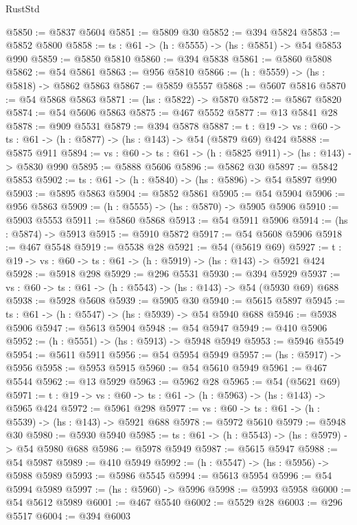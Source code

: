 \begin{lexlean}{RustStd}
\begin{coremodule}
@5850 := @5837 @5604
@5851 := @5809 @30
@5852 := @394 @5824
@5853 := @5852 @5800
@5858 := {ts : @61} -> (h : @5555) -> (hs : @5851) -> @54 @5853 @990
@5859 := @5850 @5810
@5860 := @394 @5838
@5861 := @5860 @5808
@5862 := @54 @5861
@5863 := @956 @5810
@5866 := (h : @5559) -> (hs : @5818) -> @5862 @5863
@5867 := @5859 @5557
@5868 := @5607 @5816
@5870 := @54 @5868 @5863
@5871 := (hs : @5822) -> @5870
@5872 := @5867 @5820
@5874 := @54 @5606 @5863
@5875 := @467 @5552
@5877 := @13 @5841 @28
@5878 := @909 @5531
@5879 := @394 @5878
@5887 := {t : @19} -> {vs : @60} -> {ts : @61} -> (h : @5877) -> (hs : @143) -> @54 (@5879 @69) @424
@5888 := @5875 @911
@5894 := {vs : @60} -> {ts : @61} -> (h : @5825 @911) -> (hs : @143) -> @5830 @990
@5895 := @5888 @5606
@5896 := @5862 @30
@5897 := @5842 @5853
@5902 := {ts : @61} -> (h : @5840) -> (hs : @5896) -> @54 @5897 @990
@5903 := @5895 @5863
@5904 := @5852 @5861
@5905 := @54 @5904
@5906 := @956 @5863
@5909 := (h : @5555) -> (hs : @5870) -> @5905 @5906
@5910 := @5903 @5553
@5911 := @5860 @5868
@5913 := @54 @5911 @5906
@5914 := (hs : @5874) -> @5913
@5915 := @5910 @5872
@5917 := @54 @5608 @5906
@5918 := @467 @5548
@5919 := @5538 @28
@5921 := @54 (@5619 @69)
@5927 := {t : @19} -> {vs : @60} -> {ts : @61} -> (h : @5919) -> (hs : @143) -> @5921 @424
@5928 := @5918 @298
@5929 := @296 @5531
@5930 := @394 @5929
@5937 := {vs : @60} -> {ts : @61} -> (h : @5543) -> (hs : @143) -> @54 (@5930 @69) @688
@5938 := @5928 @5608
@5939 := @5905 @30
@5940 := @5615 @5897
@5945 := {ts : @61} -> (h : @5547) -> (hs : @5939) -> @54 @5940 @688
@5946 := @5938 @5906
@5947 := @5613 @5904
@5948 := @54 @5947
@5949 := @410 @5906
@5952 := (h : @5551) -> (hs : @5913) -> @5948 @5949
@5953 := @5946 @5549
@5954 := @5611 @5911
@5956 := @54 @5954 @5949
@5957 := (hs : @5917) -> @5956
@5958 := @5953 @5915
@5960 := @54 @5610 @5949
@5961 := @467 @5544
@5962 := @13 @5929
@5963 := @5962 @28
@5965 := @54 (@5621 @69)
@5971 := {t : @19} -> {vs : @60} -> {ts : @61} -> (h : @5963) -> (hs : @143) -> @5965 @424
@5972 := @5961 @298
@5977 := {vs : @60} -> {ts : @61} -> (h : @5539) -> (hs : @143) -> @5921 @688
@5978 := @5972 @5610
@5979 := @5948 @30
@5980 := @5930 @5940
@5985 := {ts : @61} -> (h : @5543) -> (hs : @5979) -> @54 @5980 @688
@5986 := @5978 @5949
@5987 := @5615 @5947
@5988 := @54 @5987
@5989 := @410 @5949
@5992 := (h : @5547) -> (hs : @5956) -> @5988 @5989
@5993 := @5986 @5545
@5994 := @5613 @5954
@5996 := @54 @5994 @5989
@5997 := (hs : @5960) -> @5996
@5998 := @5993 @5958
@6000 := @54 @5612 @5989
@6001 := @467 @5540
@6002 := @5529 @28
@6003 := @296 @5517
@6004 := @394 @6003

\end{coremodule}
\end{lexlean}
